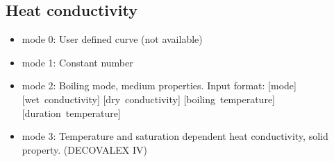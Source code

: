 \subsection{Heat conductivity}
\begin{itemize}
  \item mode 0: User defined curve (not available)
  \item mode 1: Constant number
  \item mode 2: Boiling mode, medium properties. Input format: [mode] [\mbox{wet conductivity}]
                     [\mbox{dry conductivity}]   [\mbox{boiling temperature}]
                     [\mbox{duration temperature}]
  \item mode 3: Temperature and saturation dependent heat conductivity, solid property. (DECOVALEX IV)
\end{itemize}



